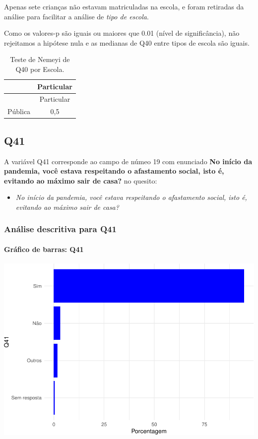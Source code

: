 \documentclass[]{article}
\providecommand{\tightlist}{%
  \setlength{\itemsep}{0pt}\setlength{\parskip}{0pt}}
\let\oldparagraph\paragraph
\renewcommand{\paragraph}[1]{\oldparagraph{#1}\mbox{}}
\begin{document}
Apenas sete crianças não estavam matriculadas na escola, e foram retiradas da análise para facilitar a análise de \emph{tipo de escola}.

Como os valores-p são iguais ou maiores que 0.01 (nível de significância), não rejeitamos a hipótese nula e as medianas de Q40 entre tipos de escola são iguais.

\begin{longtable}[]{@{}lc@{}}
\caption{\label{tab:unnamed-chunk-1595}Teste de Nemeyi de Q40 por Escola.}\tabularnewline
\toprule
& Particular\tabularnewline
\midrule
\endfirsthead
\toprule
& Particular\tabularnewline
\midrule
\endhead
Pública & 0,5\tabularnewline
\bottomrule
\end{longtable}

\cleardoublepage

\hypertarget{q41}{%
\subsection{Q41}\label{q41}}

A variável Q41 corresponde ao campo de númeo 19 com enunciado \textbf{No início da pandemia, você estava respeitando o afastamento social, isto é, evitando ao máximo sair de casa?} no quesito:

\begin{itemize}
\tightlist
\item
  \emph{No início da pandemia, você estava respeitando o afastamento social, isto é, evitando ao máximo sair de casa?}
\end{itemize}

\hypertarget{anuxe1lise-descritiva-para-q41}{%
\subsubsection{Análise descritiva para Q41}\label{anuxe1lise-descritiva-para-q41}}

\hypertarget{gruxe1fico-de-barras-q41}{%
\paragraph{Gráfico de barras: Q41}\label{gruxe1fico-de-barras-q41}}

\begin{center}\includegraphics[width=0.75\linewidth]{relatorio_covid19_files/figure-latex/unnamed-chunk-1602-1} \end{center}
\end{document}
